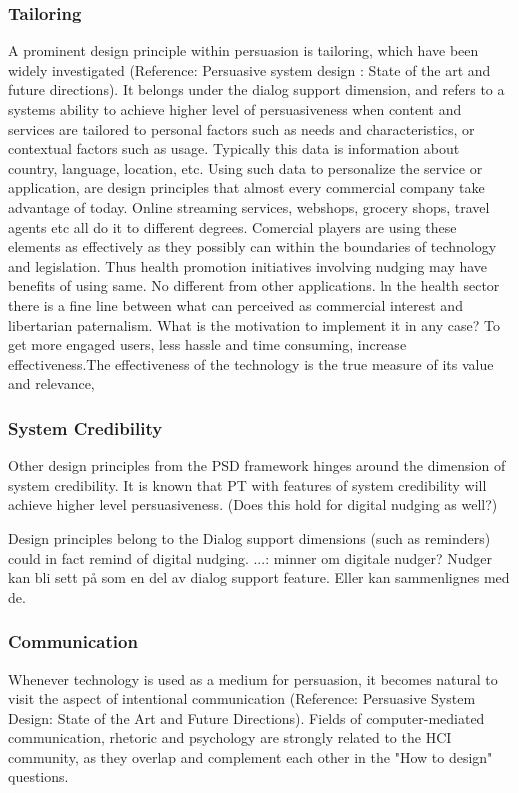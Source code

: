 \subsubsection{Tailoring}
A prominent design principle within persuasion is tailoring, which have been widely investigated (Reference: Persuasive system design : State of the art and future directions). It belongs under the dialog support dimension, and refers to a systems ability to achieve higher level of persuasiveness when content and services are tailored to personal factors such as needs and characteristics, or contextual factors such as usage. Typically this data is information about country, language, location, etc. Using such data to personalize the service or application, are design principles that almost every commercial company take advantage of today. Online streaming services, webshops, grocery shops, travel agents etc all do it to different degrees. Comercial players are using these elements as effectively as they possibly can within the boundaries of technology and legislation. Thus health promotion initiatives involving nudging may have benefits of using same. No different from other applications. ln the health sector there is a fine line between what can perceived as commercial interest and libertarian paternalism. What is the motivation to implement it in any case? To get more engaged users, less hassle and time consuming, increase effectiveness.The effectiveness of the technology is the true measure of its value and relevance, 

\subsubsection{System Credibility}
Other design principles from the PSD framework hinges around the dimension of system credibility. It is known that PT with features of system credibility will achieve higher level persuasiveness. (Does this hold for digital nudging as well?)  

Design principles belong to the Dialog support dimensions (such as reminders) could in fact remind of digital nudging. ...: minner om digitale nudger? Nudger kan bli sett på som en del av dialog support feature. Eller kan sammenlignes med de. 
 
 \subsubsection{Communication}
Whenever technology is used as a medium for persuasion, it becomes natural to visit the aspect of intentional communication (Reference: Persuasive System Design: State of the Art and Future Directions). Fields of computer-mediated communication, rhetoric and psychology are strongly related to the HCI community, as they overlap and complement each other in the "How to design" questions. 

